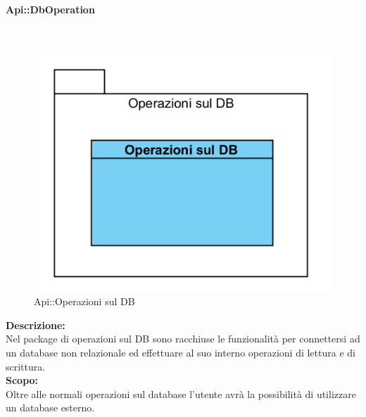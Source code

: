 \begin{samepage}
\paragraph{Api\-::DbOperation}\label{api-db}\mbox{}\\
\begin{figure}[H]
	\centering
	\includegraphics[width=14cm]{diagrammi_img/classi_e_package/api_operazionidb.png}
	\caption{Api\-::Operazioni sul DB}
\end{figure}
\end{samepage}
\textbf{Descrizione:}\\
Nel package di operazioni sul DB sono racchiuse le funzionalità per connettersi ad un database non relazionale ed effettuare al suo interno operazioni di lettura e di scrittura.\\
\textbf{Scopo:}\\
Oltre alle normali operazioni sul database l'utente avrà la possibilità di utilizzare un database esterno.

